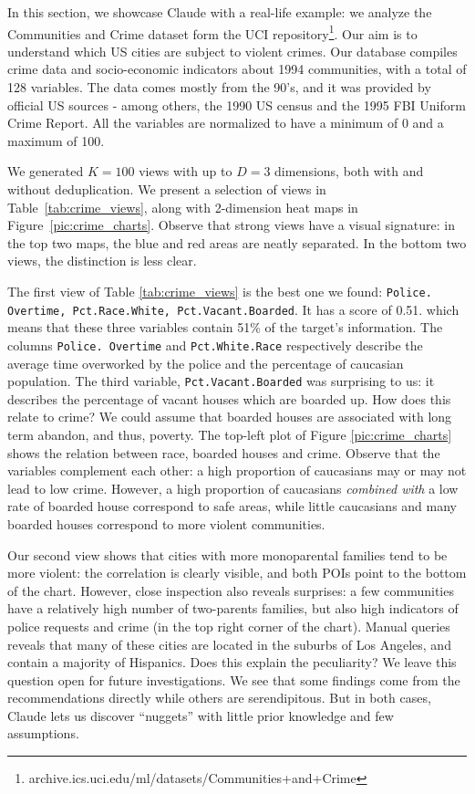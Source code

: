 In this section, we showcase Claude with a real-life example: we analyze the
Communities and Crime dataset form the UCI
repository\footnote{archive.ics.uci.edu/ml/datasets/Communities+and+Crime}.
Our aim is to understand which US cities are subject to violent crimes. Our
database compiles crime data and socio-economic indicators about 1994
communities, with a total of 128 variables. The data comes mostly from the
90's, and it was provided by official US sources - among others, the 1990 US
census and the 1995 FBI Uniform Crime Report. All the variables are normalized
to have a minimum of 0 and a maximum of 100.

We generated $K=100$ views with up to $D=3$ dimensions, both with and
without deduplication. We present a selection of views in
Table~\ref{tab:crime_views}, along with 2-dimension heat maps in
Figure~\ref{pic:crime_charts}. Observe that strong views have a visual
signature: in the top two maps, the blue and red areas are neatly separated. In
the bottom two views, the distinction is less clear.

The first view of Table \ref{tab:crime_views} is the best one we found:
\texttt{Police. Overtime, Pct.Race.White, Pct.Vacant.Boarded}. It has a score
of 0.51. which means that these three variables contain 51\% of the target's
information. The columns \texttt{Police. Overtime} and \texttt{Pct.White.Race}
respectively describe the average time overworked by the police and the
percentage of caucasian population. The third variable,
\texttt{Pct.Vacant.Boarded} was surprising to us: it describes the
percentage of vacant houses which are boarded up.  How does this relate to
crime? We could assume that boarded houses are associated with long term
abandon, and thus, poverty. The top-left plot of Figure \ref{pic:crime_charts}
shows the relation between race, boarded houses and crime. Observe that the
variables complement each other: a high proportion of caucasians may or may not
lead to low crime. However, a high proportion of caucasians \emph{combined
with} a low rate of boarded house correspond to safe areas, while little
caucasians and many boarded houses correspond to more violent communities.

Our second view shows that cities with more monoparental families tend to be
more violent: the correlation is clearly visible, and both POIs point to the
bottom of the chart. However, close inspection also reveals surprises: a few
communities have a relatively high number of two-parents families, but also
high indicators of police requests and crime (in the top right corner of the
chart). Manual queries reveals that many of these cities are located in the
suburbs of Los Angeles, and contain a majority of Hispanics. Does this explain
the peculiarity? We leave this question open for future investigations. We see
that some findings come from the recommendations directly while others are
serendipitous.  But in both cases, Claude lets us discover ``nuggets'' with
little prior knowledge and few assumptions. 

